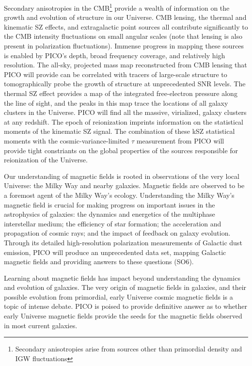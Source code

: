\documentclass[PICOReport.tex]{subfiles}
\begin{document}
Secondary anisotropies in the CMB\footnote{Secondary anisotropies arise from sources other than primordial density and \ac{IGW} fluctuations} provide a wealth of information on the growth and evolution of structure in our Universe. CMB lensing, the thermal and kinematic \ac{SZ} effects, and extragalactic point sources all contribute significantly to the CMB intensity fluctuations on small angular scales (note that lensing is also present in polarization fluctuations). Immense progress in mapping these sources is enabled by PICO's depth, broad frequency coverage, and relatively high resolution. The all-sky, projected mass map reconstructed from CMB lensing that PICO will provide can be correlated with tracers of large-scale structure to tomographically probe the growth of structure at unprecedented \ac{SNR} levels. The thermal SZ effect provides a map of the integrated free-electron pressure along the line of sight, and the peaks in this map trace the locations of all galaxy clusters in the Universe. PICO will find all the massive, virialized, galaxy clusters at any redshift.  The epoch of reionization imprints information on the statistical moments of the kinematic SZ signal. The combination of these kSZ statistical moments with the cosmic-variance-limited $\tau$ measurement from PICO will provide tight constriants on the global properties of the sources responsible for reionization of the Universe.

Our understanding of magnetic fields is rooted in observations of the very local Universe: the Milky Way and nearby galaxies. Magnetic fields are observed to be a foremost agent of the Milky Way's ecology. Understanding the Milky Way's magnetic field is crucial for making progress on important issues in the astrophysics of galaxies: the dynamics and energetics of the multiphase interstellar medium; the efficiency of star formation; the acceleration and propagation of cosmic rays; and the impact of feedback on galaxy evolution. Through its detailed high-resolution polarization measurements of Galactic dust emission, PICO will produce an unprecedented data set, mapping Galactic magnetic fields and providing answers to these questions (SO6). 

Learning about magnetic fields has impact beyond understanding the dynamics and evolution of galaxies. The very origin of magnetic fields in galaxies, and their possible evolution from primordial, early Universe cosmic magnetic fields is a topic of intense debate. PICO is poised to provide definitive answer as to whether early Universe magnetic fields provide the seeds for the magnetic fields observed in most current galaxies. 
\end{document}
